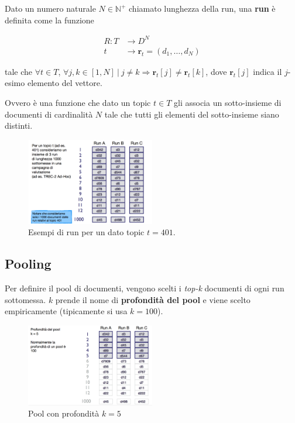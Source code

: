 Dato un numero naturale $N \in \mathbb{N}^+$ chiamato lunghezza della run, una \textbf{run} è definita come la funzione

\begin{align*}
R : T &\to D^N \\
	t &\to \mathbf{r}_t = (d_1, \ldots, d_N)
\end{align*}

\noindent tale che $\forall t \in T$, $\forall j,k \in [1,N] \ | \ j \neq k \Rightarrow \mathbf{r}_t[j] \neq  \mathbf{r}_t[k]$, dove $ \mathbf{r}_t[j]$ indica il $j$-esimo elemento del vettore.

Ovvero è una funzione che dato un topic $t \in T$ gli associa un sotto-insieme di documenti di cardinalità $N$ tale che tutti gli elementi del sotto-insieme siano distinti.

\begin{figure}[htbp]
	\centering
	\includegraphics[width=0.5\textwidth]{images/l14-fig-1.png}
	\caption{Esempi di run per un dato topic $t = 401$.}
\end{figure}


\subsection{Pooling}

Per definire il pool di documenti, vengono scelti i \textit{top-k} documenti di ogni run sottomessa. $k$ prende il nome di \textbf{profondità del pool} e viene scelto empiricamente (tipicamente si usa $k =100$).

\begin{figure}[htbp]
	\centering
	\includegraphics[width=0.5\textwidth]{images/l14-fig-2.png}
	\caption{Pool con profondità $k=5$}
\end{figure}

